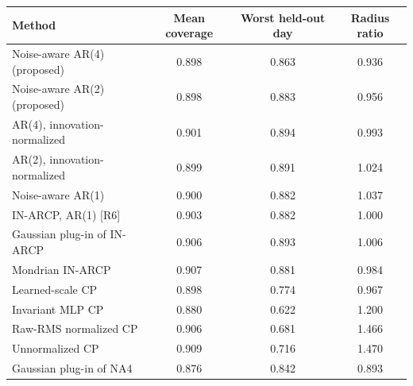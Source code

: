 \begin{tabular}{lccc}
\toprule
Method & Mean coverage & Worst held-out day & Radius ratio\\
\midrule
Noise-aware AR(4) (proposed) & 0.898 & 0.863 & 0.936\\
Noise-aware AR(2) (proposed) & 0.898 & 0.883 & 0.956\\
AR(4), innovation-normalized & 0.901 & 0.894 & 0.993\\
AR(2), innovation-normalized & 0.899 & 0.891 & 1.024\\
Noise-aware AR(1) & 0.900 & 0.882 & 1.037\\
IN-ARCP, AR(1) [R6] & 0.903 & 0.882 & 1.000\\
Gaussian plug-in of IN-ARCP & 0.906 & 0.893 & 1.006\\
Mondrian IN-ARCP & 0.907 & 0.881 & 0.984\\
Learned-scale CP & 0.898 & 0.774 & 0.967\\
Invariant MLP CP & 0.880 & 0.622 & 1.200\\
Raw-RMS normalized CP & 0.906 & 0.681 & 1.466\\
Unnormalized CP & 0.909 & 0.716 & 1.470\\
Gaussian plug-in of NA4 & 0.876 & 0.842 & 0.893\\
\bottomrule
\end{tabular}
